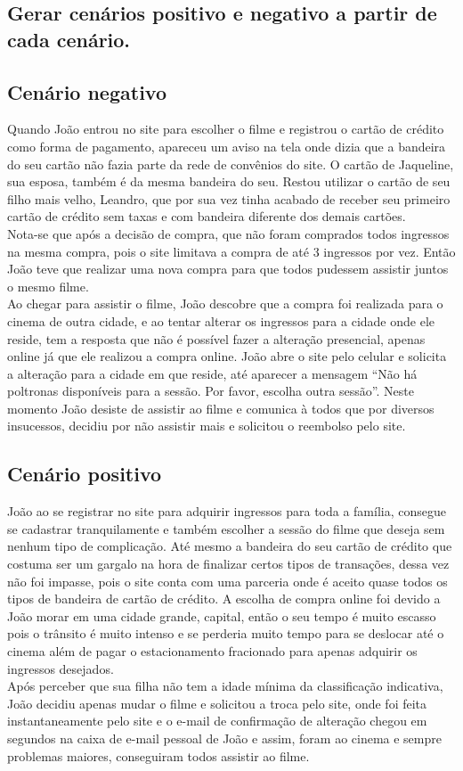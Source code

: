 \documentclass[12pt]{article}
\begin{document}
        \subsection{Gerar cenários positivo e negativo a partir de cada cenário.}
            \subsection{Cenário negativo}
            Quando João entrou no site para escolher o filme e registrou o cartão de crédito como forma de pagamento, apareceu um aviso na tela onde dizia que a bandeira do seu cartão não fazia parte da rede de convênios do site. O cartão de Jaqueline, sua esposa, também é da mesma bandeira do seu. Restou utilizar o cartão de seu filho mais velho, Leandro, que por sua vez tinha acabado de receber seu primeiro cartão de crédito sem taxas e com bandeira diferente dos demais cartões.\\
            Nota-se que após a decisão de compra, que não foram comprados todos ingressos na mesma compra, pois o site limitava a compra de até 3 ingressos por vez. Então João teve que realizar uma nova compra para que todos pudessem assistir juntos o mesmo filme. \\
            Ao chegar para assistir o filme, João descobre que a compra foi realizada para o cinema de outra cidade, e ao tentar alterar os ingressos para a cidade onde ele reside, tem a resposta que não é possível fazer a alteração presencial, apenas online já que ele realizou a compra online. João abre o site pelo celular e solicita a alteração para a cidade em que reside, até aparecer a mensagem “Não há poltronas disponíveis para a sessão. Por favor, escolha outra sessão”. Neste momento João desiste de assistir ao filme e comunica à todos que por diversos insucessos, decidiu por não assistir mais e solicitou o reembolso pelo site.
            \subsection{Cenário positivo}
            João ao se registrar no site para adquirir ingressos para toda a família, consegue se cadastrar tranquilamente e também escolher a sessão do filme que deseja sem nenhum tipo de complicação. Até mesmo a bandeira do seu cartão de crédito que costuma ser um gargalo na hora de finalizar certos tipos de transações, dessa vez não foi impasse, pois o site conta com uma parceria onde é aceito quase todos os tipos de bandeira de cartão de crédito. A escolha de compra online foi devido a João morar em uma cidade grande, capital, então o seu tempo é muito escasso pois o trânsito é muito intenso e se perderia muito tempo para se deslocar até o cinema além de pagar o estacionamento fracionado para apenas adquirir os ingressos desejados.\\
            Após perceber que sua filha não tem a idade mínima da classificação indicativa, João decidiu apenas mudar o filme e solicitou a troca pelo site, onde foi feita instantaneamente pelo site e o e-mail de confirmação de alteração chegou em segundos na caixa de e-mail pessoal de João e assim, foram ao cinema e sempre problemas maiores, conseguiram todos assistir ao filme.
            
\end{document}
